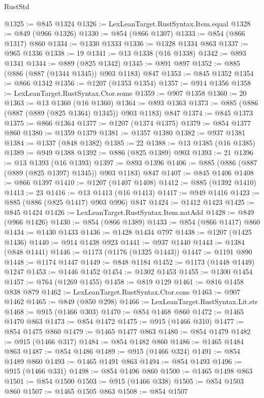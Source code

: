 \begin{lexlean}{RustStd}
\begin{coremodule}
@1325 := @845 @1324
@1326 := LexLeanTarget.RustSyntax.Item.equal
@1328 := @849 (@966 @1326)
@1330 := @854 (@866 @1307)
@1333 := @854 (@866 @1317) @860
@1334 := @1330 @1333
@1336 := @1328 @1334 @863
@1337 := @965 @1336
@1338 := 19
@1341 := @13 @1338 (@16 @1338)
@1342 := @893 @1341
@1344 := @889 (@825 @1342)
@1345 := @891 @897
@1352 := @885 (@886 (@887 (@1344 @1345)) @903 @1183) @847
@1353 := @845 @1352
@1354 := @866 @1342
@1356 := @1207 (@1353 @1354)
@1357 := @914 @1356
@1358 := LexLeanTarget.RustSyntax.Ctor.some
@1359 := @907 @1358
@1360 := 20
@1363 := @13 @1360 (@16 @1360)
@1364 := @893 @1363
@1373 := @885 (@886 (@887 (@889 (@825 @1364) @1345)) @903 @1183) @847
@1374 := @845 @1373
@1375 := @866 @1364
@1377 := @1207 (@1374 @1375)
@1379 := @854 @1377 @860
@1380 := @1359 @1379
@1381 := @1357 @1380
@1382 := @937 @1381
@1384 := @1337 (@848 @1382)
@1385 := 22
@1388 := @13 @1385 (@16 @1385)
@1389 := @949 @1388
@1392 := @886 (@825 @1389) @903
@1393 := 21
@1396 := @13 @1393 (@16 @1393)
@1397 := @893 @1396
@1406 := @885 (@886 (@887 (@889 (@825 @1397) @1345)) @903 @1183) @847
@1407 := @845 @1406
@1408 := @866 @1397
@1410 := @1207 (@1407 @1408)
@1412 := @885 (@1392 @1410)
@1413 := 23
@1416 := @13 @1413 (@16 @1413)
@1417 := @949 @1416
@1423 := @885 (@886 (@825 @1417) @903 @996) @847
@1424 := @1412 @1423
@1425 := @845 @1424
@1426 := LexLeanTarget.RustSyntax.Item.natAdd
@1428 := @849 (@966 @1426)
@1430 := @854 (@866 @1389)
@1433 := @854 (@866 @1417) @860
@1434 := @1430 @1433
@1436 := @1428 @1434 @797
@1438 := @1207 (@1425 @1436)
@1440 := @914 @1438 @923
@1441 := @937 @1440
@1443 := @1384 (@848 @1441)
@1446 := @1173 (@1176 (@1325 @1443))
@1447 := @1191 @890
@1448 := @1174 @1447
@1449 := @848 @1184
@1452 := @1173 (@1448 @1449) @1247
@1453 := @1446 @1452
@1454 := @1302 @1453
@1455 := @1300 @1454
@1457 := @764 (@1269 @1455)
@1458 := @819 @129
@1461 := @816 @1458 @838 @879
@1462 := LexLeanTarget.RustSyntax.Ctor.cons
@1463 := @907 @1462
@1465 := @849 (@850 @298)
@1466 := LexLeanTarget.RustSyntax.Lit.str
@1468 := @915 (@1466 @303)
@1470 := @854 @1468 @860
@1472 := @1465 @1470 @863
@1473 := @854 @1472
@1475 := @915 (@1466 @310)
@1477 := @854 @1475 @860
@1479 := @1465 @1477 @863
@1480 := @854 @1479
@1482 := @915 (@1466 @317)
@1484 := @854 @1482 @860
@1486 := @1465 @1484 @863
@1487 := @854 @1486
@1489 := @915 (@1466 @324)
@1491 := @854 @1489 @860
@1493 := @1465 @1491 @863
@1494 := @854 @1493
@1496 := @915 (@1466 @331)
@1498 := @854 @1496 @860
@1500 := @1465 @1498 @863
@1501 := @854 @1500
@1503 := @915 (@1466 @338)
@1505 := @854 @1503 @860
@1507 := @1465 @1505 @863
@1508 := @854 @1507

\end{coremodule}
\end{lexlean}

